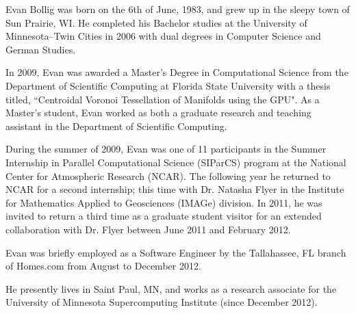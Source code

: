 \begin{biosketch}

Evan Bollig was born on the 6th of June, 1983, and grew up in the sleepy town of Sun Prairie, WI. He completed his Bachelor studies at the University of Minnesota--Twin Cities in 2006 with dual degrees in Computer Science and German Studies. 

In 2009, Evan was awarded a Master's Degree in Computational Science from the Department of Scientific Computing at Florida State University with a thesis titled, ``Centroidal Voronoi Tessellation of Manifolds using the GPU". As a Master's student, Evan worked as both a graduate research and teaching assistant in the Department of Scientific Computing.

During the summer of 2009, Evan was one of 11 participants in the Summer Internship in Parallel Computational Science (SIParCS) program at the National Center for Atmospheric Research (NCAR). The following year he returned to NCAR for a second internship; this time with Dr. Natasha Flyer in the Institute for Mathematics Applied to Geosciences (IMAGe) division. In 2011, he was invited to return a third time as a graduate student visitor for an extended collaboration with Dr. Flyer between June 2011 and February 2012. 

Evan was briefly employed as a Software Engineer by the Tallahassee, FL branch of Homes.com from August to December 2012. 

He presently lives in Saint Paul, MN, and works as a research associate for the University of Minnesota Supercomputing Institute (since December 2012). 


\end{biosketch}
